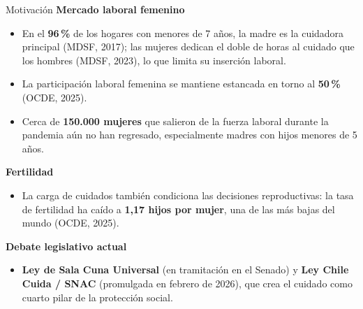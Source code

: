 \documentclass[aspectratio=169,10pt]{beamer}
\begin{document}
\begin{frame}{Motivación}
\begingroup
{}
{\small\textcolor{steel}{\textbf{Mercado laboral femenino}}}
\begin{itemize}
  \small
  \item En el \textbf{96\,\%} de los hogares con menores de 7 años, la madre es la cuidadora principal (MDSF, 2017); las mujeres dedican el doble de horas al cuidado que los hombres (MDSF, 2023), lo que limita su inserción laboral.
  \item La participación laboral femenina se mantiene estancada en torno al \textbf{50\,\%} (OCDE, 2025).
  \item Cerca de \textbf{150.000 mujeres} que salieron de la fuerza laboral durante la pandemia aún no han regresado, especialmente madres con hijos menores de 5 años.
\end{itemize}

\vspace{4pt}
{\small\textcolor{steel}{\textbf{Fertilidad}}}
\begin{itemize}
  \small
  \item La carga de cuidados también condiciona las decisiones reproductivas: la tasa de fertilidad ha caído a \textbf{1,17 hijos por mujer}, una de las más bajas del mundo (OCDE, 2025).
\end{itemize}

\vspace{4pt}
{\small\textcolor{steel}{\textbf{Debate legislativo actual}}}
\begin{itemize}
  \small
  \item \textbf{Ley de Sala Cuna Universal} (en tramitación en el Senado) y \textbf{Ley Chile Cuida / SNAC} (promulgada en febrero de 2026), que crea el cuidado como cuarto pilar de la protección social.
\end{itemize}
\endgroup
\end{frame}
\end{document}
